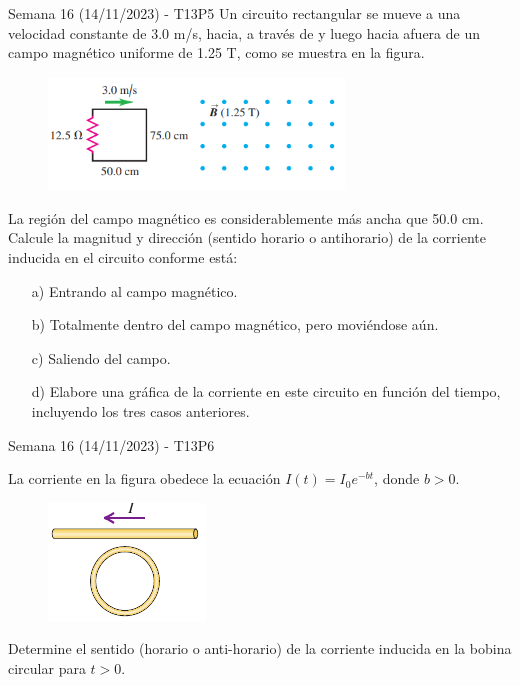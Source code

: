 \begin{frame}{Semana 16 (14/11/2023) - T13P5}
    Un circuito rectangular se mueve a una velocidad constante
de 3.0 m/s, hacia, a través de y luego hacia afuera de un campo magnético uniforme de 1.25 T, como se muestra en la figura.

\begin{figure}
        \centering
        \includegraphics[height=0.3\textwidth,width=0.7\textwidth]{figures/t15p2.png}
    \end{figure}

\vspace{-1.5em}

La
región del campo magnético es considerablemente más ancha que
50.0 cm. Calcule la magnitud y dirección (sentido horario o antihorario) de la corriente inducida en el circuito conforme está:

\begin{itemize}
    \item[a)] Entrando
al campo magnético.
    \item[b)] Totalmente dentro del campo magnético, pero
moviéndose aún.
    \item[c)] Saliendo del campo.
    \item[d)] Elabore una gráfica de
la corriente en este circuito en función del tiempo, incluyendo los tres
casos anteriores. 
\end{itemize}
\end{frame}

\begin{frame}{Semana 16 (14/11/2023) - T13P6}
    
    La corriente en la figura obedece la ecuación $I(t)=I_0e^{-bt}$, donde $b>0$.
    
    \begin{figure}
        \centering
        \includegraphics[scale=0.6]{figures/t11p5.png}
    \end{figure}
    
    Determine el sentido (horario o anti-horario)
    de la corriente inducida en la bobina circular
    para $t>0$.
    
\end{frame}

